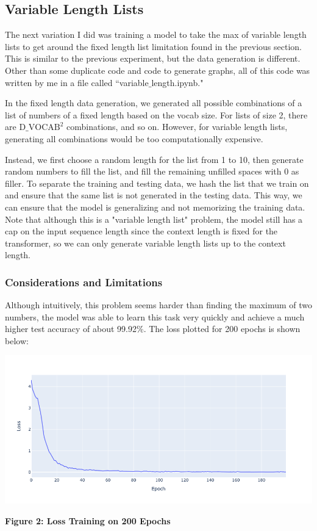 \documentclass{article}
\begin{document}
\subsection{Variable Length Lists}

The next variation I did was training a model to take the max of variable length lists to get around the fixed length list limitation found in the previous section. This is similar to the previous experiment, but the data generation is different. Other than some duplicate code and code to generate graphs, all of this code was written by me in a file called ``variable$\_$length.ipynb."

In the fixed length data generation, we generated all possible combinations of a list of numbers of a fixed length based on the vocab size. For lists of size 2, there are $\text{D$\_$VOCAB}^2$ combinations, and so on. However, for variable length lists, generating all combinations would be too computationally expensive. 

Instead, we first choose a random length for the list from 1 to 10, then generate random numbers to fill the list, and fill the remaining unfilled spaces with 0 as filler. To separate the training and testing data, we hash the list that we train on and ensure that the same list is not generated in the testing data. This way, we can ensure that the model is generalizing and not memorizing the training data. Note that although this is a "variable length list" problem, the model still has a cap on the input sequence length since the context length is fixed for the transformer, so we can only generate variable length lists up to the context length. 

\subsubsection{Considerations and Limitations}
Although intuitively, this problem seems harder than finding the maximum of two numbers, the model was able to learn this task very quickly and achieve a much higher test accuracy of about 99.92$\%$. The loss plotted for 200 epochs is shown below:
\begin{center}
    \includegraphics[scale=0.4]{variable_length.png}

    \textbf{Figure 2: Loss Training on 200 Epochs}
\end{center}
\end{document}
